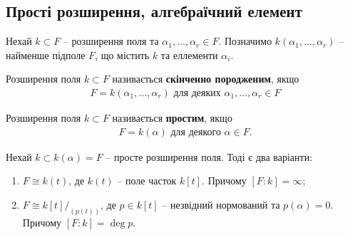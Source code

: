 \documentclass{math_library}
\begin{document}
\subsection{Прості розширення, алгебраїчний елемент}
Нехай $k \subset F$ -- розширення поля та $\alpha_1,\dots,\alpha_r \in F$. Позначимо $k(\alpha_1,\dots,\alpha_r)$ -- найменше підполе $F$, що містить $k$ та еллементи $\alpha_i$.

\begin{definition}
Розширення поля $k \subset F$ називається \textbf{скінченно породженим}, якщо
\begin{align*}
F = k(\alpha_1,\dots,\alpha_r) \text{ для деяких } \alpha_1,\dots,\alpha_r \in F
\end{align*}
\end{definition}

\begin{definition}
Розширення поля $k \subset F$ називається \textbf{простим}, якщо
\begin{align*}
F = k(\alpha) \text{ для деякого } \alpha \in F.
\end{align*}
\end{definition}

\begin{proposition}
Нехай $k \subset k(\alpha) = F$ -- просте розширення поля. Тоді є два варіанти:
\begin{enumerate}[nosep,wide=0pt,label={\arabic*)}]
\item $F \cong k(t)$, де $k(t)$ -- поле часток $k[t]$. Причому $[F:k] = \infty$;
\item $F \cong k[t]/_{(p(t))}$, де $p \in k[t]$ -- незвідний нормований та $p(\alpha) = 0$. Причому $[F:k] = \deg p$.
\end{enumerate}
\end{proposition}
\end{document}
